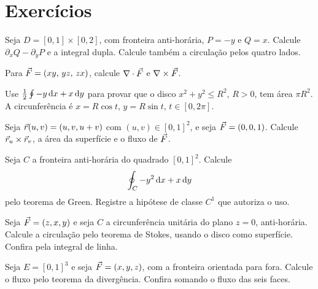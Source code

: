 \documentclass[11pt,a4paper]{article}
\begin{document}
\section{Exercícios}

\begin{exercicio}
Seja $D=[0,1]\times[0,2]$, com fronteira anti-horária, $P=-y$ e $Q=x$. Calcule $\partial_x Q-\partial_y P$ e a integral dupla. Calcule também a circulação pelos quatro lados.
\end{exercicio}

\begin{exercicio}
Para $\vec{F}=(xy,\, yz,\, zx)$, calcule $\nabla\cdot\vec{F}$ e $\nabla\times\vec{F}$.
\end{exercicio}

\begin{exercicio}
Use $\frac12\oint -y\,\mathrm{d} x+x\,\mathrm{d} y$ para provar que o disco $x^2+y^2\le R^2$, $R>0$, tem área $\pi R^2$. A circunferência é $x=R\cos t$, $y=R\sin t$, $t\in[0,2\pi]$.
\end{exercicio}

\begin{exercicio}
Seja $\vec{r}(u,v)=(u,v,u+v)$ com $(u,v)\in[0,1]^2$, e seja $\vec{F}=(0,0,1)$. Calcule $\vec{r}_u\times\vec{r}_v$, a área da superfície e o fluxo de $\vec{F}$.
\end{exercicio}

\begin{exercicio}
Seja $C$ a fronteira anti-horária do quadrado $[0,1]^2$. Calcule
\[
\oint_C -y^2\,\mathrm{d} x+x\,\mathrm{d} y
\]
pelo teorema de Green. Registre a hipótese de classe $C^1$ que autoriza o uso.
\end{exercicio}

\begin{exercicio}
Seja $\vec{F}=(z,x,y)$ e seja $C$ a circunferência unitária do plano $z=0$, anti-horária. Calcule a circulação pelo teorema de Stokes, usando o disco como superfície. Confira pela integral de linha.
\end{exercicio}

\begin{exercicio}
Seja $E=[0,1]^3$ e seja $\vec{F}=(x,y,z)$, com a fronteira orientada para fora. Calcule o fluxo pelo teorema da divergência. Confira somando o fluxo das seis faces.
\end{exercicio}
\end{document}
